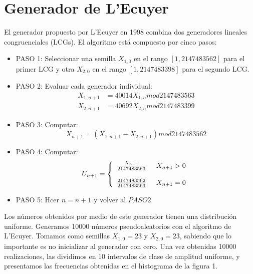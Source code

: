 \documentclass[10pt,journal,compsoc]{IEEEtran}
\begin{document}
\section{Generador de L'Ecuyer}
El generador propuesto por L'Ecuyer en 1998 combina dos generadores lineales congruenciales (LCGs).
El algoritmo est\'a compuesto por cinco pasos:
\begin{itemize}
 \item{PASO 1:} Seleccionar una semilla $X_{1,0}$ en el rango $[1,2147483562]$ para el primer LCG y otra $X_{2,0}$ en el rango $[1,2147483398]$ para el segundo LCG.\\
 \item{PASO 2:} Evaluar cada generador individual:
 \begin{align*}
  X_{1,n+1} &= 40014 X_{1,n} mod 2147483563\\
  X_{2,n+1} &= 40692 X_{2,n} mod 2147483399
 \end{align*}
 
 \item{PASO 3:} Computar:
 \begin{equation*}
  X_{n+1} = (X_{1,n+1} - X_{2,n+1}) mod 2147483562
 \end{equation*}
 
 \item{PASO 4:} Computar:
  \begin{equation*}
  \label{eq:f(t)}
  U_{n+1} = \left\{
  \begin{array}{rl}
	\frac{X_{n+1}}{2147483563} \hspace{0.5cm} X_{n+1} > 0\\\\
	\frac{2147483562}{2147483563} \hspace{0.5cm} X_{n+1} = 0\\
  \end{array} \right.
  \end{equation*}

 \item{PASO 5:} Hcer $n = n + 1$ y volver al $PASO 2$
\end{itemize}

Los n\'umeros obtenidos por medio de este generador tienen una distribuci\'on uniforme.
Generamos 10000 n\'umeros pseudoaleatorios con el algoritmo de L'Ecuyer.  Tomamos como semillas $X_{1,0}=23$ y $X_{2,0}=23$, sabiendo que lo importante
es no inicializar al generador con cero.  Una vez obtenidas 10000 realizaciones, las dividimos en 10 intervalos de clase de amplitud uniforme, y 
presentamos las frecuencias obtenidas en el histograma de la figura 1.
\end{document}
